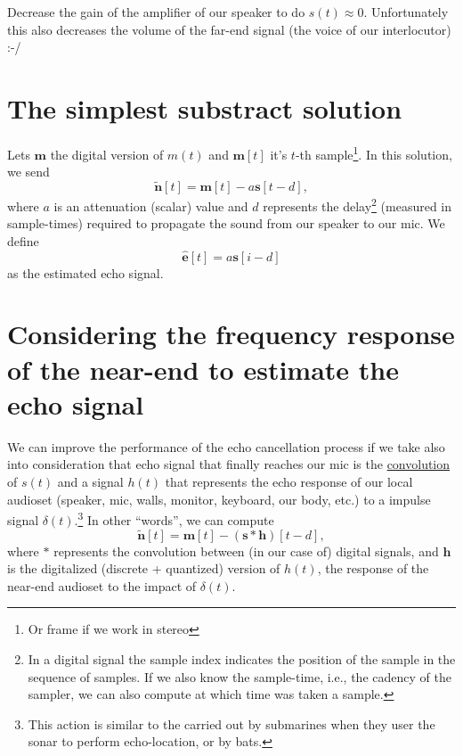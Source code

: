 Decrease the gain of the amplifier of our speaker to do
$s(t)\approx 0$. Unfortunately this also decreases the volume of the
far-end signal (the voice of our interlocutor) :-/

\section{The simplest substract solution}
Lets ${\mathbf m}$ the digital version of $m(t)$ and ${\mathbf m}[t]$
it's $t$-th sample\footnote{Or frame if we work in stereo}. In this
solution, we send
\begin{equation}
  \tilde{\mathbf n}[t] = {\mathbf m}[t] - a{\mathbf s}[t-d],
  \label{eq:simplest}
\end{equation}
where $a$ is an attenuation (scalar) value and $d$ represents the
delay\footnote{In a digital signal the sample index indicates the
  position of the sample in the sequence of samples. If we also know
  the sample-time, i.e., the cadency of the sampler, we can also
  compute at which time was taken a sample.} (measured in
sample-times) required to propagate the sound from our speaker to our
mic. We define
\begin{equation}
  \hat{\mathbf e}[t] = a{\mathbf s}[i-d]
\end{equation}
as the estimated echo signal.

\section{Considering the frequency response of the near-end to estimate the echo signal}
We can improve the performance of the echo cancellation process if we
take also into consideration that echo signal that finally reaches our
mic is the
\href{https://en.wikipedia.org/wiki/Convolution}{convolution} of
$s(t)$ and a signal $h(t)$ that represents the echo response of our
local audioset (speaker, mic, walls, monitor, keyboard, our body,
etc.) to a impulse signal $\delta(t)$.\footnote{This action is similar
  to the carried out by submarines when they user the sonar to perform
  echo-location, or by bats.} In other ``words'', we can compute
\begin{equation}
 \tilde{\mathbf n}[t] = {\mathbf m}[t] - ({\mathbf s}*{\mathbf h})[t-d],
  \label{eq:using_convolution}
\end{equation}
where $*$ represents the convolution between (in our case of) digital
signals, and ${\mathbf h}$ is the digitalized (discrete + quantized)
version of $h(t)$, the response of the near-end audioset to the impact
of $\delta(t)$.

